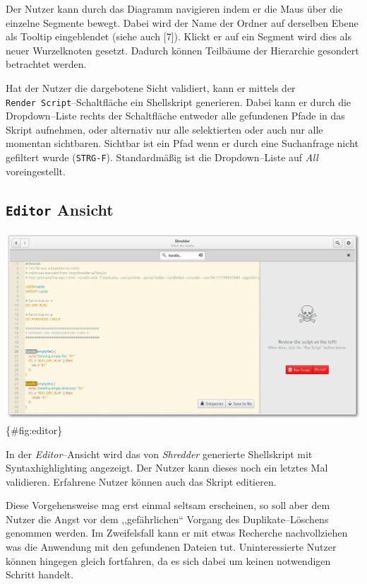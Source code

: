\documentclass[11pt,ngerman,toc=listof,index=totoc]{scrreprt}
\begin{document}
Der Nutzer kann durch das Diagramm navigieren indem er die Maus über die
einzelne Segmente bewegt. Dabei wird der Name der Ordner auf derselben
Ebene als Tooltip eingeblendet (siehe auch {[}7{]}). Klickt er auf ein
Segment wird dies als neuer Wurzelknoten gesetzt. Dadurch können
Teilbäume der Hierarchie gesondert betrachtet werden.

Hat der Nutzer die dargebotene Sicht validiert, kann er mittels der
\texttt{Render\ Script}--Schaltfläche ein Shellskript generieren. Dabei
kann er durch die Dropdown--Liste rechts der Schaltfläche entweder alle
gefundenen Pfade in das Skript aufnehmen, oder alternativ nur alle
selektierten oder auch nur alle momentan sichtbaren. Sichtbar ist ein
Pfad wenn er durch eine Suchanfrage nicht gefiltert wurde
(\texttt{STRG-F}). Standardmäßig ist die Dropdown--Liste auf \emph{All}
voreingestellt.

\subsection{\texorpdfstring{\texttt{Editor}
Ansicht}{Editor Ansicht}}\label{editor-ansicht}

\includegraphics{docs/pics/gui_editor.png} \{\#fig:editor\}

In der \emph{Editor}--Ansicht wird das von \emph{Shredder} generierte
Shellskript mit Syntaxhighlighting angezeigt. Der Nutzer kann dieses
noch ein letztes Mal validieren. Erfahrene Nutzer können auch das Skript
editieren.

Diese Vorgehensweise mag erst einmal seltsam erscheinen, so soll aber
dem Nutzer die Angst vor dem ,,gefährlichen`` Vorgang des
Duplikate--Löschens genommen werden. Im Zweifelsfall kann er mit etwas
Recherche nachvollziehen was die Anwendung mit den gefundenen Dateien
tut. Uninteressierte Nutzer können hingegen gleich fortfahren, da es
sich dabei um keinen notwendigen Schritt handelt.
\end{document}
